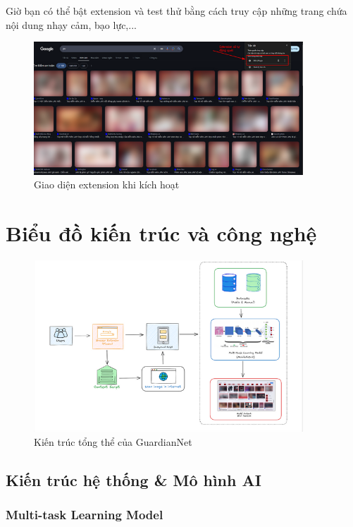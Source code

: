 \documentclass[12pt,a4paper]{article}
\begin{document}
Giờ bạn có thể bật extension và test thử bằng cách truy cập những trang chứa nội dung nhạy cảm, bạo lực,...

\begin{figure}[H]
  \centering
  \includegraphics[width=0.9\textwidth]{./Images/image7.png}
  \caption{Giao diện extension khi kích hoạt}
\end{figure}

\section{Biểu đồ kiến trúc và công nghệ}

\begin{figure}[H]
  \centering
  \includegraphics[width=0.9\textwidth]{./Images/image8.png}
  \caption{Kiến trúc tổng thể của GuardianNet}
\end{figure}

\subsection{Kiến trúc hệ thống \& Mô hình AI}

\subsubsection{Multi-task Learning Model}
\end{document}
